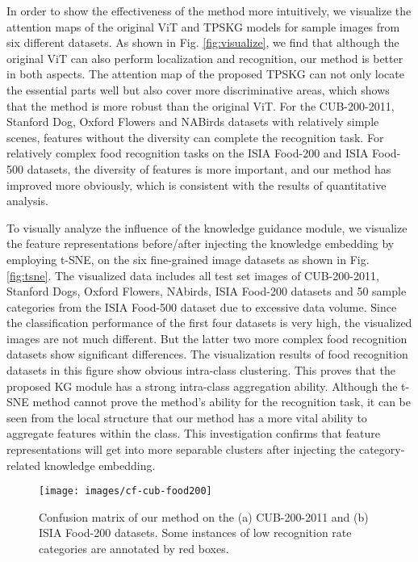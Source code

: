 \documentclass[5p,twocolumn]{elsarticle}
\begin{document}
In order to show the effectiveness of the method more intuitively, we visualize the attention maps of the original ViT and TPSKG models for sample images from six different datasets.
As shown in Fig. \ref{fig:visualize}, we find that although the original ViT can also perform localization and recognition, our method is better in both aspects. The attention map of the proposed TPSKG can not only locate the essential parts well but also cover more discriminative areas, which shows that the method is more robust than the original ViT. For the CUB-200-2011, Stanford Dog, Oxford Flowers and NABirds datasets with relatively simple scenes, features without the diversity can complete the recognition task. For relatively complex food recognition tasks on the ISIA Food-200 and ISIA Food-500 datasets, the diversity of features is more important, and our method has improved more obviously, which is consistent with the results of quantitative analysis. 



To visually analyze the influence of the knowledge guidance module, we visualize the feature representations before/after injecting the knowledge embedding by employing t-SNE, on the six fine-grained image datasets as shown in Fig. \ref{fig:tsne}. 
The visualized data includes all test set images of CUB-200-2011, Stanford Dogs, Oxford Flowers, NAbirds, ISIA Food-200 datasets and 50 sample categories from the ISIA Food-500 dataset due to excessive data volume. 
Since the classification performance of the first four datasets is very high, the visualized images are not much different. But the latter two more complex food recognition datasets show significant differences. 
The visualization results of food recognition datasets in this figure show obvious intra-class clustering. This proves that the proposed KG module has a strong intra-class aggregation ability. 
Although the t-SNE method cannot prove the method's ability for the recognition task, it can be seen from the local structure that our method has a more vital ability to aggregate features within the class. This investigation confirms that feature representations will get into more separable clusters after injecting the category-related knowledge embedding.



\begin{figure*}[]
\centering
 \texttt{[image: images/cf-cub-food200]}
  \caption{Confusion matrix of our method on the (a) CUB-200-2011 and (b) ISIA Food-200 datasets. Some instances of low recognition rate categories are annotated by red boxes.}
  \label{fig:cf}
\end{figure*}
\end{document}

